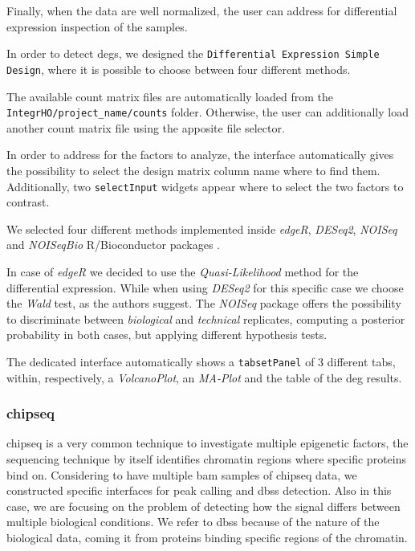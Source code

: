 
Finally, when the data are well normalized, the user can address for differential expression inspection of the samples.

In order to detect \glspl{deg}, we designed the \lstinline!Differential Expression Simple Design!, where it is possible to choose between four different methods.

The available count matrix files are automatically loaded from the \lstinline!IntegrHO/project_name/counts! folder.
Otherwise, the user can additionally load another count matrix file using the apposite file selector.

In order to address for the factors to analyze, the interface automatically gives the possibility to select the design matrix column name where to find them.
Additionally, two \lstinline!selectInput! widgets appear where to select the two factors to contrast.

We selected four different methods implemented inside \textit{edgeR}, \textit{DESeq2}, \textit{NOISeq} and \textit{NOISeqBio} R/Bioconductor packages \cite{Robinson2009, Love2014,Tarazona2012}.

In case of \textit{edgeR} we decided to use the \textit{Quasi-Likelihood} method for the differential expression.
While when using \textit{DESeq2} for this specific case we choose the \textit{Wald} test, as the authors suggest.
The \textit{NOISeq} package offers the possibility to discriminate between \textit{biological} and \textit{technical} replicates, computing a posterior probability in both cases, but applying different hypothesis tests.

The dedicated interface automatically shows a \lstinline!tabsetPanel! of 3 different tabs, within, respectively, a \textit{VolcanoPlot}, an \textit{MA-Plot} and the table of the \gls{deg} results.


\subsubsection{\gls{chipseq}} \label{sec:integrhochip}
\gls{chipseq} is a very common technique to investigate multiple epigenetic factors, the sequencing technique by itself identifies chromatin regions where specific proteins bind on.
Considering to have multiple \gls{bam} samples of \gls{chipseq} data, we constructed specific interfaces for peak calling and \glspl{dbs} detection.
Also in this case, we are focusing on the problem of detecting how the signal differs between multiple biological conditions.
We refer to \glspl{dbs} because of the nature of the biological data, coming it from proteins binding specific regions of the chromatin.


